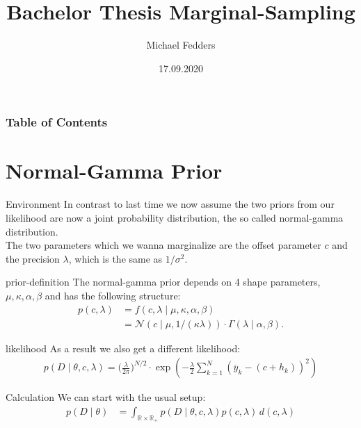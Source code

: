 \documentclass{beamer}
\title{Bachelor Thesis Marginal-Sampling}
\date{17.09.2020}
\author{Michael Fedders}
\newcommand{\s}{\sigma^2}
\newcommand{\y}{\overline{y}}
\newcommand{\R}{\mathbb{R}}
\begin{document}
	\maketitle
  	\begin{frame}[plain]
		\frametitle{Table of Contents}
		\tableofcontents
	\end{frame}
	
\section{Normal-Gamma Prior}

	\begin{frame}{Environment}
		In contrast to last time we now assume the two priors from our likelihood 			are now a joint probability distribution, the so called normal-gamma 				distribution. \\
		The two parameters which we wanna marginalize are the offset parameter $c$ 		and the precision $\lambda$, which is the same as $1/\s$.
	\end{frame}
  	
  	\begin{frame}{prior-definition}
  		The normal-gamma prior depends on 4 shape parameters, $\mu, \kappa, 				\alpha, \beta$ and has the following structure:
  		\begin{align}
  			p(c, \lambda) &= f(c, \lambda \mid \mu, \kappa, \alpha, \beta) \\
  			&= \mathcal{N}(c \mid \mu, 1/(\kappa \lambda)) \cdot \Gamma(\lambda 				\mid \alpha, \beta).
  		\end{align}
  	\end{frame}
  	
  	\begin{frame}{likelihood}
  		As a result we also get a different likelihood:
  		\begin{align}
  			 p(D \mid \theta, c, \lambda) = \biggl(\frac{\lambda}{2\pi}\biggr)					^{N/2} \cdot \exp\left( - \frac{\lambda}{2} \sum_{k = 1}^N (\y_k - (c 				+ h_k))^2 \right)
  		\end{align}
  	\end{frame}
  	
	\begin{frame}{Calculation}
  		We can start with the usual setup:
  		\begin{align}
    		p(D \mid \theta) &= \int_{\R \times \R_+} p(D \mid \theta,c,\lambda) 				p(c, \lambda) \, d(c, \lambda)
		\end{align}
  	\end{frame}  	
  	
\end{document}

